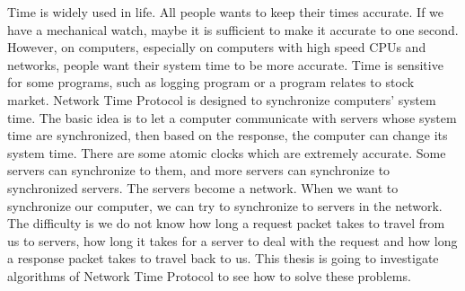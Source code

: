 

Time is widely used in life. All people wants to keep their times accurate. If
we have a mechanical watch, maybe it is sufficient to make it accurate to one
second. However, on computers, especially on computers with high speed CPUs and
networks, people want their system time to be more accurate.  Time is sensitive
for some programs, such as logging program or a program relates to stock
market. Network Time Protocol is designed to synchronize computers' system
time. The basic idea is to let a computer communicate with servers whose system
time are synchronized, then based on the response, the computer can change its
system time. There are some atomic clocks which are extremely accurate. Some
servers can synchronize to them, and more servers can synchronize to
synchronized servers. The servers become a network.  When we want to
synchronize our computer, we can try to synchronize to servers in the network.
The difficulty is we do not know how long a request packet takes to travel from
us to servers, how long it takes for a server to deal with the request and how
long a response packet takes to travel back to us.  This thesis is going to
investigate algorithms of Network Time Protocol to see how to solve these
problems.


\afterpreface
